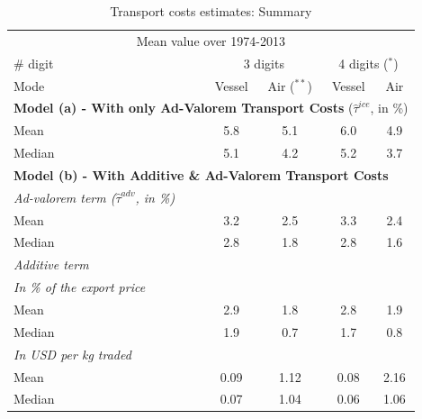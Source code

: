 \documentclass[a4paper,11pt]{article}
\begin{document}
\begin{table}[htbp]
  \centering
  \footnotesize{
  \caption{Transport costs estimates: Summary \label{tab:summary_results}}
  \begin{center}
    \begin{tabular}{l|cc|cc}
      \hline \hline
    \multicolumn{5}{c}{Mean value over 1974-2013}   \\
    \# digit & \multicolumn{2}{c}{3 digits} & \multicolumn{2}{c}{4 digits ($^\ast$)} \\ \hline
    Mode  & Vessel & Air ($^{\ast \ast}$) & Vessel & Air \\ \hline
    \multicolumn{5}{l}{\textbf{Model (a) - With only Ad-Valorem Transport Costs} ($\widehat{\tau}^{ice}$, in \%)}  \\ \hline
    Mean  & 5.8 & 5.1 & 6.0 & 4.9 \\
    Median & 5.1 & 4.2 & 5.2 & 3.7 \\ \hline
    \multicolumn{5}{l}{\textbf{Model (b) - With Additive \& Ad-Valorem Transport Costs} } \\ \hline
   \textit{Ad-valorem term ($\widehat{\tau}^{adv}$, in \%)} & & & & \\ \hline
    Mean  & 3.2 & 2.5 & 3.3 & 2.4 \\
    Median & 2.8 & 1.8 & 2.8 & 1.6 \\ \hline
    \textit{Additive term }& & & &   \\ \hline
    \textit{In \% of the export price} &&&& \\ \hline
        Mean  & 2.9 & 1.8 & 2.8 & 1.9 \\
    Median & 1.9 & 0.7 & 1.7 & 0.8 \\ \hline
   \textit{ In USD per kg traded }&&&& \\ \hline
    Mean & 0.09	&1.12	&0.08&	2.16 \\
    Median & 0.07	&1.04	&0.06&	1.06 \\ \hline

\end{tabular}
\end{center}}
\end{table}
\end{document}
